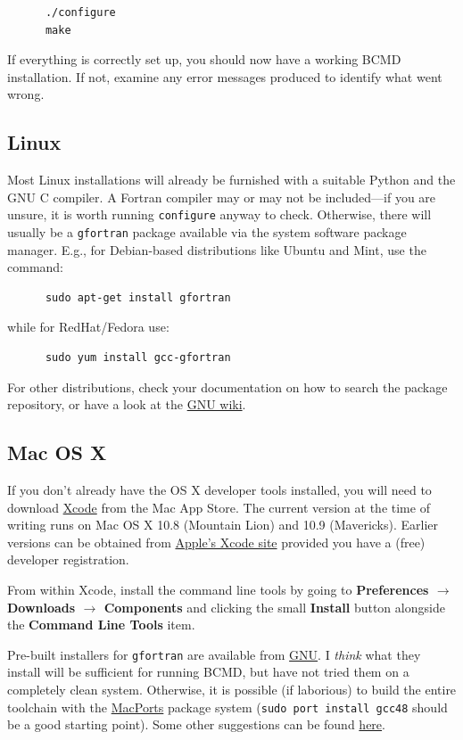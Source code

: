 \documentclass[a4paper,11pt]{article}
\begin{document}
\begin{verbatim}
      ./configure
      make
\end{verbatim}

If everything is correctly set up, you should now have a working BCMD installation. If not, examine any error messages produced to identify what went wrong.

\subsection{Linux}\label{linux}

Most Linux installations will already be furnished with a suitable Python and the GNU C compiler. A Fortran compiler may or may not be included---if you are unsure, it is worth running \texttt{configure} anyway to check. Otherwise, there will usually be a \texttt{gfortran} package available via the system software package manager. E.g., for Debian-based distributions like Ubuntu and Mint, use the command:
\begin{verbatim}
      sudo apt-get install gfortran
\end{verbatim} 
while for RedHat/Fedora use:
\begin{verbatim}
      sudo yum install gcc-gfortran
\end{verbatim} 
For other distributions, check your documentation on how to search the package repository, or have a look at the \href{http://gcc.gnu.org/wiki/GFortranDistros}{GNU wiki}. 

\subsection{Mac OS X}\label{osx}

If you don't already have the OS X developer tools installed, you will need to download \href{http://itunes.apple.com/us/app/xcode/id497799835?ls=1&mt=12}{Xcode} from the Mac App Store. The current version at the time of writing runs on Mac OS X 10.8 (Mountain Lion) and 10.9 (Mavericks). Earlier versions can be obtained from \href{https://developer.apple.com/xcode/}{Apple's Xcode site} provided you have a (free) developer registration.

From within Xcode, install the command line tools by going to \textbf{Preferences $\rightarrow$ Downloads $\rightarrow$ Components} and clicking the small \textbf{Install} button alongside the \textbf{Command Line Tools} item.

Pre-built installers for \texttt{gfortran} are available from \href{http://gcc.gnu.org/wiki/GFortranBinariesMacOS}{GNU}. I \textit{think} what they install will be sufficient for running BCMD, but have not tried them on a completely clean system. Otherwise, it is possible (if laborious) to build the entire toolchain with the \href{http://www.macports.org}{MacPorts} package system (\texttt{sudo port install gcc48} should be a good starting point). Some other suggestions can be found \href{http://scicomp.stackexchange.com/questions/2469/how-should-i-install-a-fortran-compiler-on-a-mac-os-x-10-x-x-4}{here}.
\end{document}
